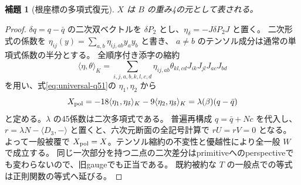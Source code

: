 \documentclass[11pt,a4paper]{ltjsarticle}
\newtheorem{lemma}[theorem]{補題}
\theoremstyle{remark}
\begin{document}
\begin{lemma}[根座標の多項式復元]\label{lem:xpol}
$X$ は $B$ の重み4の元として表される。
\end{lemma}
\begin{proof}
$\delta q=q-\bar q$ の二次双ベクトルを $\delta P_2$ とし、$\eta_\delta=-J\delta P_2J$ と置く。
二次形式の係数を $\eta_{ij}(y)=\sum_{a,b}\eta_{ij,ab}y_ay_b$ と書き、
$a\ne b$ のテンソル成分は通常の単項式係数の半分とする。
全順序付き添字の縮約
\[
 \langle\eta,\theta\rangle_K=
 \sum_{i,j,a,b,k,l,c,d}\eta_{ij,ab}\theta_{kl,cd}J_{ik}J_{jl}J_{ac}J_{bd}
\]
を用い、式\eqref{eq:universal-q51}の $\eta_1,\eta_2$ から
\[
 X_{\rm pol}=-18\langle\eta_1,\eta_\delta\rangle_K
              -9\langle\eta_2,\eta_\delta\rangle_K
             =\lambda(\beta)(q-\bar q)
\]
と定める。$\lambda$ の45係数は二次多項式である。
普遍再構成 $q=\bar q+Nc$ を代入し、
$r=\lambda N-\langle D_3,-\rangle$ と置くと、六次元断面の全記号計算で $rU=rV=0$ となる。
よって一般被覆で $X_{\rm pol}=X$。テンソル縮約の不変性と優越性により全一般 $W$ で成立する。
同じ一次部分を持つ二点の二次差分はprimitiveへのperspectiveでも変わらないので、旧gaugeでも正当である。
既約被約な $T$ の一般点での等式は正則関数の等式へ延びる\cite{xpol-new}。
\end{proof}
\end{document}
